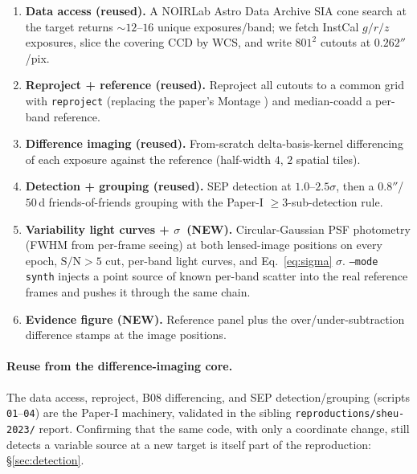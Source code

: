 \documentclass[11pt,letterpaper]{article}
\newcommand{\sig}{\ensuremath{\sigma}}
\begin{document}
\begin{enumerate}
\item[\texttt{01}] \textbf{Data access (reused).} A NOIRLab Astro Data Archive
      \autocite{nsf_noirlab_archive} SIA cone search at the target returns
      $\sim$$12$--$16$ unique exposures/band; we fetch InstCal $g/r/z$
      exposures, slice the covering CCD by WCS, and write $801^2$ cutouts at
      $0.262''$/pix.
\item[\texttt{02}] \textbf{Reproject + reference (reused).} Reproject all
      cutouts to a common grid with \texttt{reproject} \autocite{reproject2020}
      (replacing the paper's Montage \autocite{jacob2010montage}) and
      median-coadd a per-band reference.
\item[\texttt{03}] \textbf{Difference imaging (reused).} From-scratch
      \citet{bramich2008} delta-basis-kernel differencing of each exposure
      against the reference (half-width $4$, $2$ spatial tiles).
\item[\texttt{04}] \textbf{Detection + grouping (reused).} SEP
      \autocite{barbary2016sep,barbary2018sep} detection at $1.0$--$2.5\sigma$,
      then a $0.8''$/$50$\,d friends-of-friends grouping with the Paper-I
      $\geq 3$-sub-detection rule.
\item[\texttt{05}] \textbf{Variability light curves + \sig\ (NEW).}
      Circular-Gaussian PSF photometry (FWHM from per-frame seeing) at both
      lensed-image positions on every epoch, $\mathrm{S/N} > 5$ cut, per-band
      light curves, and Eq.~\ref{eq:sigma} \sig. \texttt{--mode synth} injects
      a point source of known per-band scatter into the real reference frames
      and pushes it through the same chain.
\item[\texttt{06}] \textbf{Evidence figure (NEW).} Reference panel plus the
      over/under-subtraction difference stamps at the image positions.
\end{enumerate}

\paragraph{Reuse from the difference-imaging core.} The data access, reproject,
B08 differencing, and SEP detection/grouping (scripts \texttt{01}--\texttt{04})
are the Paper-I machinery, validated in the sibling
\texttt{reproductions/sheu-2023/} report. Confirming that the same code, with
only a coordinate change, still detects a variable source at a new target is
itself part of the reproduction: \S\ref{sec:detection}.
\end{document}
